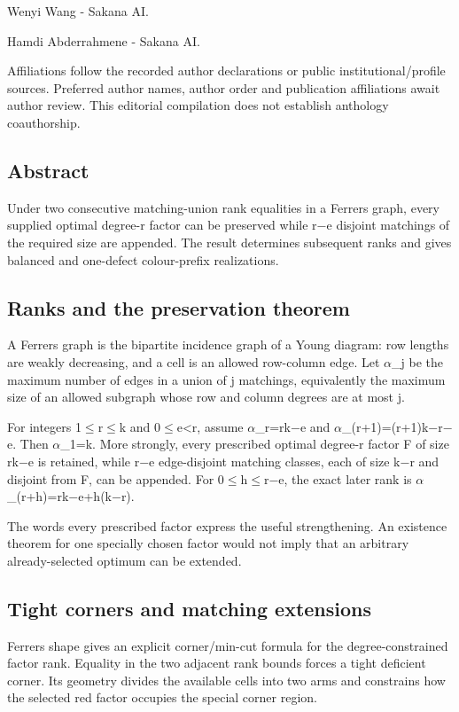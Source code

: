 \documentclass[11pt,a4paper]{article}
\begin{document}
{\small Wenyi Wang  -  Sakana AI.\par}

{\small Hamdi Abderrahmene  -  Sakana AI.\par}

{\small Affiliations follow the recorded author declarations or public institutional/profile sources. Preferred author names, author order and publication affiliations await author review. This editorial compilation does not establish anthology coauthorship.\par}

\subsection{Abstract}
Under two consecutive matching-union rank equalities in a Ferrers graph, every supplied optimal degree-r factor can be preserved while r\ensuremath{-}e disjoint matchings of the required size are appended. The result determines subsequent ranks and gives balanced and one-defect colour-prefix realizations.

\subsection{Ranks and the preservation theorem}
A Ferrers graph is the bipartite incidence graph of a Young diagram: row lengths are weakly decreasing, and a cell is an allowed row-column edge. Let \ensuremath{\alpha}\_j be the maximum number of edges in a union of j matchings, equivalently the maximum size of an allowed subgraph whose row and column degrees are at most j.

For integers 1\ensuremath{\leq}r\ensuremath{\leq}k and 0\ensuremath{\leq}e<r, assume \ensuremath{\alpha}\_r=rk\ensuremath{-}e and \ensuremath{\alpha}\_(r+1)=(r+1)k\ensuremath{-}r\ensuremath{-}e. Then \ensuremath{\alpha}\_1=k. More strongly, every prescribed optimal degree-r factor F of size rk\ensuremath{-}e is retained, while r\ensuremath{-}e edge-disjoint matching classes, each of size k\ensuremath{-}r and disjoint from F, can be appended. For 0\ensuremath{\leq}h\ensuremath{\leq}r\ensuremath{-}e, the exact later rank is \ensuremath{\alpha}\_(r+h)=rk\ensuremath{-}e+h(k\ensuremath{-}r).

The words every prescribed factor express the useful strengthening. An existence theorem for one specially chosen factor would not imply that an arbitrary already-selected optimum can be extended.

\subsection{Tight corners and matching extensions}
Ferrers shape gives an explicit corner/min-cut formula for the degree-constrained factor rank. Equality in the two adjacent rank bounds forces a tight deficient corner. Its geometry divides the available cells into two arms and constrains how the selected red factor occupies the special corner region.
\end{document}
